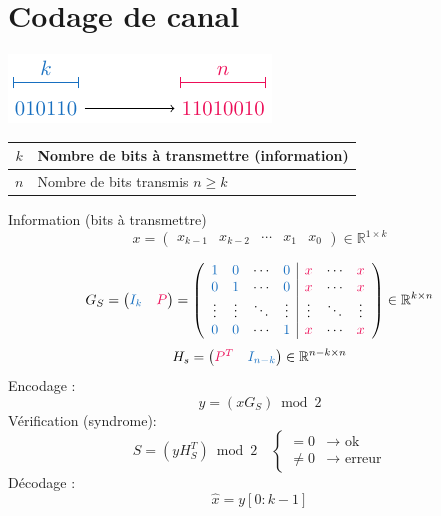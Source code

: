 \documentclass[resume.tex]{subfiles}
\begin{document}
\section{Codage de canal}
\begin{center}
\includegraphics[scale=1,page=1]{drwg_1.pdf}
\end{center}
\begin{center}
\begin{tabular}{c|l}
$k$ & Nombre de bits à transmettre (information)\\\hline
$n$ & Nombre de bits transmis $n\geq k$
\end{tabular}
\end{center}
Information (bits à transmettre)
$$x=\begin{pmatrix}
x_{k-1} &
x_{k-2} &
\cdots &
x_1 &
x_0
\end{pmatrix}\in \mathbb{R}^{1\times k}$$

$$G_S=\begin{pmatrix}
\textcolor{RoyalBlue}{I_k} & \textcolor{OrangeRed}{P}
\end{pmatrix}=
\left(\begin{array}{cccc|cccc}
\textcolor{RoyalBlue}{1} & \textcolor{RoyalBlue}{0} & \cdots & \textcolor{RoyalBlue}{0} & \textcolor{OrangeRed}{x} & \cdots & \textcolor{OrangeRed}{x}\\
\textcolor{RoyalBlue}{0} & \textcolor{RoyalBlue}{1} & \cdots & \textcolor{RoyalBlue}{0} & \textcolor{OrangeRed}{x} & \cdots & \textcolor{OrangeRed}{x}\\
\vdots & \vdots & \ddots & \vdots & \vdots & \ddots & \vdots\\
\textcolor{RoyalBlue}{0} & \textcolor{RoyalBlue}{0} & \cdots & \textcolor{RoyalBlue}{1} & \textcolor{OrangeRed}{x} & \cdots & \textcolor{OrangeRed}{x}
\end{array}\right)\in\mathbb{R}^{k\times n}$$
$$H_s=\begin{pmatrix}
\textcolor{OrangeRed}{P^{T}} & \textcolor{RoyalBlue}{I_{n-k}}
\end{pmatrix}\in\mathbb{R}^{n-k\times n}$$
Encodage :
$$y=(xG_S)\bmod 2$$
Vérification (syndrome):
$$S=(yH_S^T)\bmod 2\quad \begin{cases}
=0 &\longrightarrow \text{ ok}\\
\neq 0 & \longrightarrow \text{ erreur}
\end{cases}$$
Décodage :
$$\hat{x}=y[0:k-1]$$
\end{document}
